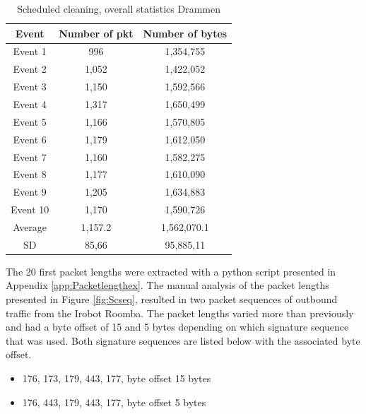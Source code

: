\begin{table}[H]
\centering
\caption{Scheduled cleaning, overall statistics Drammen}
\label{tab:scoverallDRA}
\begin{tabular}{|c|c|c|}
\hline
\textbf{Event} & \textbf{Number of pkt} & \textbf{Number of bytes} \\ \hline
Event 1        & 996                    & 1,354,755                   \\ \hline
Event 2        & 1,052                   & 1,422,052                   \\ \hline
Event 3        & 1,150                   & 1,592,566                   \\ \hline
Event 4        & 1,317                   & 1,650,499                   \\ \hline
Event 5        & 1,166                   & 1,570,805                   \\ \hline
Event 6        & 1,179                   & 1,612,050                   \\ \hline
Event 7        & 1,160                   & 1,582,275                   \\ \hline
Event 8        & 1,177                   & 1,610,090                   \\ \hline
Event 9        & 1,205                   & 1,634,883                   \\ \hline
Event 10       & 1,170                   & 1,590,726                   \\ \hline
Average        & 1,157.2                 & 1,562,070.1                 \\ \hline
SD        & 85,66
       & 95,885,11               \\ \hline
\end{tabular}
\end{table}

The 20 first packet lengths were extracted with a python script presented in Appendix \ref{app:Packetlengthex}. The manual analysis of the packet lengths presented in Figure \ref{fig:Scseq}, resulted in two packet sequences of outbound traffic from the Irobot Roomba. The packet lengths varied more than previously and had a byte offset of 15 and 5 bytes depending on which signature sequence that was used. Both signature sequences are listed below with the associated byte offset. 

\begin{itemize}
    \item 176, 173, 179, 443, 177, byte offset 15 bytes 
    \item 176, 443, 179, 443, 177, byte offset 5 bytes
\end{itemize}

